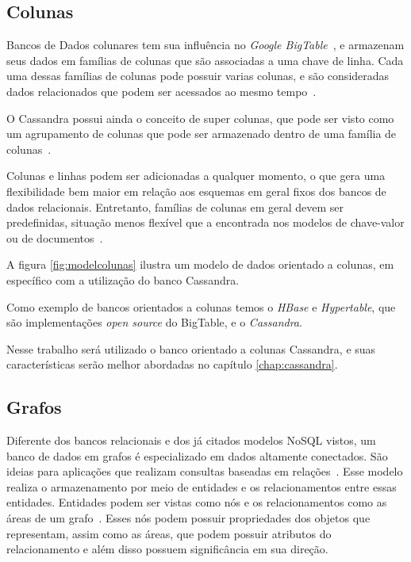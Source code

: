 \subsection*{Colunas}
Bancos de Dados colunares tem sua influência no \emph{Google BigTable}~\cite{bigtable}, e armazenam seus dados em famílias de colunas que são associadas a uma chave de linha. Cada uma dessas famílias de colunas pode possuir varias colunas, e são consideradas dados relacionados que podem ser acessados ao mesmo tempo~\cite{pramod}. 

O Cassandra possui ainda o conceito de super colunas, que pode ser visto como um agrupamento de colunas que pode ser armazenado dentro de uma família de colunas~\cite{pramod}.

Colunas e linhas podem ser adicionadas a qualquer momento, o que gera uma flexibilidade bem maior em relação aos esquemas em geral fixos dos bancos de dados relacionais.  Entretanto, famílias de colunas em geral devem ser predefinidas, situação menos flexível que a encontrada nos modelos de chave-valor ou de documentos~\cite{nosqleval}.  

A figura \ref{fig:modelcolunas} ilustra um modelo de dados orientado a colunas, em específico com a utilização do banco Cassandra.

Como exemplo de bancos orientados a colunas temos o \emph{HBase} e \emph{Hypertable}, que são implementações \emph{open source} do BigTable, e o \emph{Cassandra}.

Nesse trabalho será utilizado o banco orientado a colunas Cassandra, e suas características serão melhor abordadas no capítulo \ref{chap:cassandra}.


\subsection*{Grafos}
Diferente dos bancos relacionais e dos já citados modelos NoSQL vistos, um banco de dados em grafos é especializado em dados altamente conectados. São ideias para aplicações que realizam consultas baseadas em relações~\cite{nosqleval}.
Esse modelo realiza o armazenamento por meio de entidades e os relacionamentos entre essas entidades. Entidades podem ser vistas como nós e os relacionamentos como as áreas de um grafo~\cite{pramod}. Esses nós podem possuir propriedades dos objetos que representam, assim como as áreas, que podem possuir atributos do relacionamento e além disso possuem significância em sua direção.

